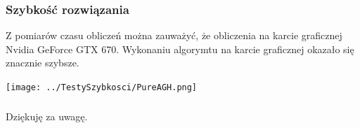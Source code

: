 \begin{frame}
\frametitle{Szybkość rozwiązania}

Z pomiarów czasu obliczeń można zauważyć, że obliczenia na karcie graficznej Nvidia GeForce GTX 670.
Wykonaniu algorymtu na karcie graficznej okazało się znacznie szybsze.
\begin{center}
\texttt{[image: ../TestySzybkosci/PureAGH.png]}

\end{center}



\end{frame}

\begin{frame}
\frametitle{}
\begin{center}
Dziękuję za uwagę.
\end{center}
\end{frame}
